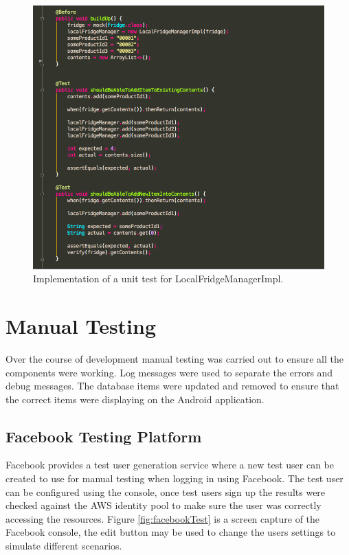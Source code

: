 \documentclass[a4paper, 11pt]{article}
\begin{document}
\begin{figure}[!htbp]
\centering
\includegraphics[width=\textwidth]{unitTest}
\caption{Implementation of a unit test for LocalFridgeManagerImpl.}\label{fig:unitTest}
\end{figure}
\clearpage

\section{Manual Testing} 
Over the course of development manual testing was carried out to ensure all the components were working. Log messages were used to separate the errors and debug messages. The database items were updated and removed to ensure that the correct items were displaying on the Android application.

\subsection{Facebook Testing Platform}
Facebook provides a test user generation service where a new test user can be created to use for manual testing when logging in using Facebook. The test user can be configured using the console, once test users sign up the results were checked against the AWS identity pool to make sure the user was correctly accessing the resources. 
Figure \ref{fig:facebookTest} is a screen capture of the Facebook console, the edit button may be used to change the users settings to simulate different scenarios.
\vspace{\baselineskip}
\end{document}
